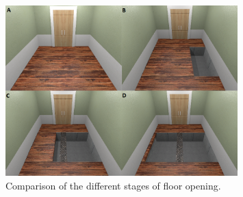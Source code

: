 \begin{figure}[H]
\centering
\includegraphics[width=0.8\textwidth]{images/OpenComparison.png}
\caption{Comparison of the different stages of floor opening.}
\label{OpenImg}
\end{figure}


